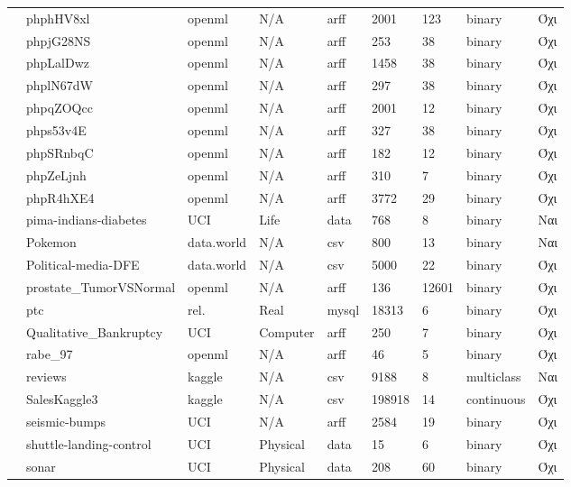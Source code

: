 {\begin{longtable}{|l| l| l | l | l | l |l | l | l | }
 			\rownumber & phphHV8xl & openml & N/A & arff & 2001& 123&binary &Όχι \\
 			\rownumber & phpjG28NS & openml & N/A & arff & 253&38 &binary & Όχι \\
 			\rownumber & phpLalDwz & openml & N/A & arff & 1458&38 &binary & Όχι \\
 			\rownumber & phplN67dW & openml & N/A & arff &297 &38 &binary & Όχι \\
 			\rownumber & phpqZOQcc & openml & N/A & arff & 2001& 12& binary& Όχι\\
 			\rownumber & phps53v4E & openml & N/A & arff & 327& 38&binary &Όχι \\
 			\rownumber & phpSRnbqC \citep{planning} & openml & N/A & arff & 182 & 12 & binary & Όχι \\
 			\rownumber & phpZeLjnh & openml & N/A & arff &310 &7 & binary&Όχι \\
 			\rownumber & phpR4hXE4 & openml & N/A & arff & 3772 & 29 & binary & Όχι \\
 			\rownumber & pima-indians-diabetes \citep{pima} & UCI & Life & data & 768 & 8 & binary & Ναι \\
 			\rownumber & Pokemon & data.world& N/A& csv & 800 & 13 & binary& Ναι\\
 			\rownumber & Political-media-DFE & data.world & N/A & csv & 5000 & 22  & binary& Όχι \\
 			\rownumber & prostate\_TumorVSNormal & openml & N/A & arff & 136 & 12601  & binary & Όχι \\
 			\rownumber & ptc \citep{Helma2001} & rel.& Real  & mysql & 18313 & 6 & binary & Όχι \\
 			\rownumber & Qualitative\_Bankruptcy \citep{bankruptcy} & UCI & Computer & arff & 250 & 7 & binary & Όχι \\
 			\rownumber & rabe\_97 \citep{rabe} & openml & N/A & arff & 46 & 5 & binary & Όχι \\
 			\rownumber & reviews & kaggle & N/A & csv & 9188&8 & multiclass & Ναι \\
 			\rownumber & SalesKaggle3 \citep{sales} & kaggle & N/A & csv & 198918 & 14 & continuous & Όχι \\
 			\rownumber & seismic-bumps \citep{seismic} & UCI & N/A & arff & 2584 & 19& binary & Όχι \\
 			\rownumber & shuttle-landing-control \citep{shuttle} & UCI & Physical & data & 15  & 6 & binary &  Όχι \\
 				\rownumber & sonar & UCI & Physical & data & 208 & 60 & binary  & Όχι \\

\end{longtable}}
